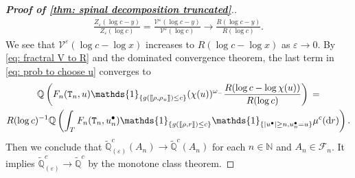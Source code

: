 \documentclass[12pt]{article}
\def\llbracket{[\hspace{-.10em} [ }
\def\rrbracket{ ] \hspace{-.10em}]}
\numberwithin{equation}{section}
\theoremstyle{plain}
\theoremstyle{definition}
\newcommand{\D}{\mathrm{d}}
\begin{document}
\begin{proof}[\textbf{Proof of \cref{thm: spinal decomposition truncated}}.]
\begin{align}\label{eq: fractral V to R}
    \frac{Z_{\varepsilon}(\log c - y)}{Z_{\varepsilon}(\log c )} = \frac{\mathscr{V}^{\varepsilon}(\log c -  y)}{\mathscr{V}^{\varepsilon}(\log c )}\longrightarrow  \frac{R(\log c - y)}{R(\log c )}.
\end{align}
We see that $\mathscr{V}^{\varepsilon}(\log c-\log x) $ increases to $R(\log c-\log x)$ as $\varepsilon\to 0$. By \eqref{eq: fractral V to R} and the dominated convergence theorem, the last term in \eqref{eq: prob to choose u} converges to
\begin{multline*}
\mathbb Q\left( F_n({\tt T}_n,u)\mathds{1}_{\{g(\llbracket \rho,\rho_u \rrbracket)\le c\}}(\chi(u))^{\omega_-}\frac{R(\log c-\log \chi(u))}{R(\log c)}\right)\,=\\
R(\log c)^{-1}\mathbb Q\left(\int_T F_n({\tt T}_n,u^{\bullet}_n)\mathds{1}_{\{g(\llbracket \rho, r \rrbracket)\le c \}}\mathds{1}_{\{|u^\bullet|\ge n,u^\bullet_n=u\}}\mu^c{}(\D r) \right).
\end{multline*}
Then we conclude that $\tilde{\mathbb{Q}}^{c}_{(\varepsilon)}(A_n) \to \tilde{\mathbb{Q}}^c(A_n)$ for each $n\in \mathbb N$ and $A_n\in \mathcal{F}_n$. It implies $\tilde{\mathbb{Q}}^{c}_{(\varepsilon)} \to \tilde{\mathbb{Q}}^c$ by the monotone class theorem.


\end{proof}
\end{document}
